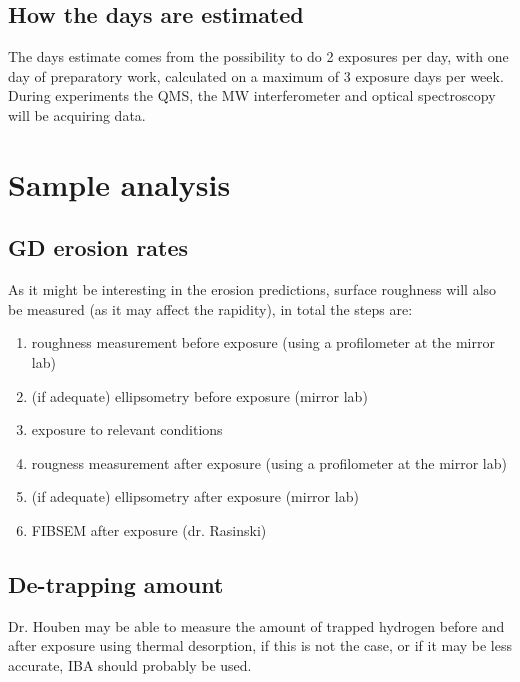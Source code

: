 \documentclass{article}
\begin{document}
\subsection*{How the days are estimated}
The days estimate comes from the possibility to do 2 exposures per day,
with one day of preparatory work, calculated on a maximum of 3 exposure days per week.
During experiments the QMS, the MW interferometer and optical spectroscopy will
be acquiring data.
\section{Sample analysis}
\subsection*{GD erosion rates}
As it might be interesting in the erosion predictions, surface roughness will also be measured
(as it may affect the rapidity), in total the steps are:
\begin{enumerate}
    \item roughness measurement before exposure (using a profilometer at the mirror lab)
    \item (if adequate) ellipsometry before exposure (mirror lab)
    \item exposure to relevant conditions
    \item rougness measurement after exposure (using a profilometer at the mirror lab)
    \item (if adequate) ellipsometry after exposure (mirror lab)
    \item FIBSEM after exposure (dr. Rasinski)
\end{enumerate}
\subsection*{De-trapping amount}
Dr. Houben may be able to measure the amount of trapped hydrogen before and after exposure using
thermal desorption, if this is not the case, or if it may be less accurate, IBA should probably be used.


\end{document}
